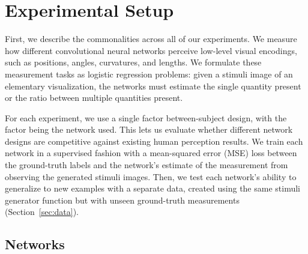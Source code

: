\section{Experimental Setup}

First, we describe the commonalities across all of our experiments. We measure how different convolutional neural networks perceive low-level visual encodings, such as positions, angles, curvatures, and lengths. We formulate these measurement tasks as logistic regression problems: given a stimuli image of an elementary visualization, the networks must estimate the single quantity present or the ratio between multiple quantities present. 

For each experiment, we use a single factor between-subject design, with the factor being the network used. This lets us evaluate whether different network designs are competitive against existing human perception results. We train each network in a supervised fashion with a mean-squared error (MSE) loss between the ground-truth labels and the network's estimate of the measurement from observing the generated stimuli images. Then, we test each network's ability to generalize to new examples with a separate data, created using the same stimuli generator function but with unseen ground-truth measurements (Section~\ref{sec:data}).


\subsection{Networks}
\label{sec:networks}

